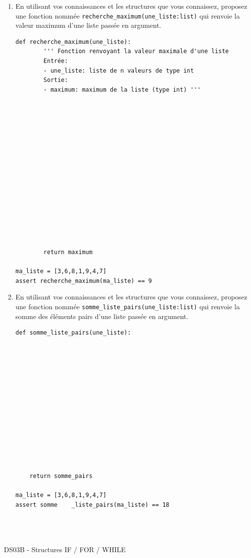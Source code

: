 \documentclass[a4paper,12pt,openany]{book}
\begin{document}
\begin{enumerate}
	Quelle est la valeur renvoyée par \verb+fonc5(6)+? \dotfill
	
	
	\newpage
	
	\item En utilisant vos connaissances et les structures que vous connaissez, proposez une fonction nommée \verb+recherche_maximum(une_liste:list)+ qui renvoie la valeur maximum d'une liste passée en argument.
	
\begin{lstlisting}[numbers=none]
def recherche_maximum(une_liste):
		''' Fonction renvoyant la valeur maximale d'une liste
		Entrée:
		- une_liste: liste de n valeurs de type int
		Sortie:
		- maximum: maximum de la liste (type int) '''
















		return maximum
		
ma_liste = [3,6,8,1,9,4,7]
assert recherche_maximum(ma_liste) == 9
\end{lstlisting}	
	
	
	\bigskip
	
	\item En utilisant vos connaissances et les structures que vous connaissez, proposez une fonction nommée \verb+somme_liste_pairs(une_liste:list)+ qui renvoie la somme des éléments pairs d'une liste passée en argument.
	
\begin{lstlisting}[numbers=none]
def somme_liste_pairs(une_liste):
		
		









		
		
		
	return somme_pairs
	
ma_liste = [3,6,8,1,9,4,7]
assert somme	_liste_pairs(ma_liste) == 18
		
		
		
\end{lstlisting}	

\end{enumerate}


\newpage

\begin{center}\begin{large}
DS03B - Structures IF / FOR / WHILE
\end{large}\end{center}
\end{document}
